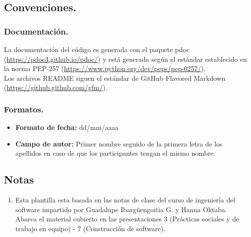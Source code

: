 \documentclass[a4paper,12pt]{article}
\begin{document}
\subsection{Convenciones.}{
\subsubsection{Documentación.}{
  La documentación del código es generada con el paquete pdoc
  (\url{https://pdoc3.github.io/pdoc/}) y está generada según el estándar
  establecido en la norma PEP-257
  (\url{https://www.python.org/dev/peps/pep-0257/}).\\
  Los archivos README siguen el estándar de GitHub Flavored Markdown
  (\url{https://github.github.com/gfm/}).
}

\subsubsection{Formatos.}{
  \begin{itemize}
    \item{\textbf{Formato de fecha:} dd/mm/aaaa}
    \item{\textbf{Campo de autor:} Primer nombre seguido de la primera letra de
      los apellidos en caso de que los participantes tengan el mismo nombre.
    }
  \end{itemize}
}
\subsection{Notas}{
  \begin{enumerate}
    \item{Esta plantilla esta basada en las notas de clase del curso de
      ingeniería del software impartido por Guadalupe Ibargüengoitia G. y Hanna
      Oktaba.\\
      Abarca el material cubierto en las presentaciones 3 (Prácticas sociales y
      de trabajo en equipo) - 7 (Construcción de software).
    }
  \end{enumerate}
}
}



\end{document}
